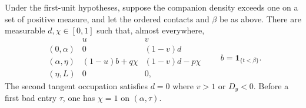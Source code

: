 \begin{lemma}
\label{lem:variation-joint-occupation}
Under the first-unit hypotheses, suppose the companion density
exceeds one on a set of positive measure, and let the
ordered contacts and $\beta$ be as above. There are measurable
$d,\chi\in[0,1]$ such that, almost everywhere,
\begin{equation}\label{eq:joint-source-equations}
 \begin{array}{c|cc}
 &u&v\\ \hline
 (0,\alpha)&0&(1-v)d\\
 (\alpha,\eta)&(1-u)b+q\chi&(1-v)d-p\chi\\
 (\eta,L)&0&0,
 \end{array}
 \qquad b=\mathbf1_{\{t<\beta\}}.
\end{equation}
The second tangent occupation satisfies $d=0$ where $v>1$ or
$D_y<0$. Before a first bad entry $\tau$, one has $\chi=1$
on $(\alpha,\tau)$.
\end{lemma}
